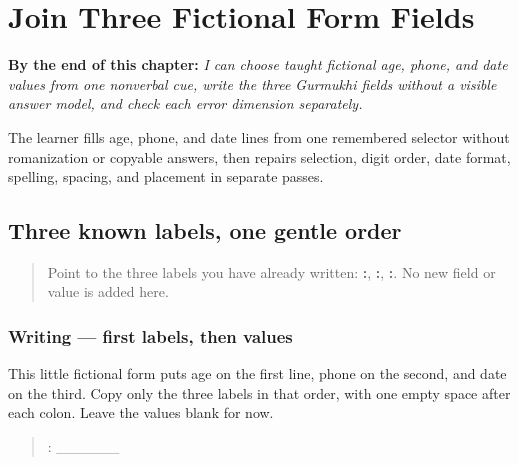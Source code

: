 
\chapter{Join Three Fictional Form Fields}
\label{ch:pa-form-age-phone-date-checkpoint}

\begin{chapteropening}
\textbf{By the end of this chapter:} \emph{I can choose taught fictional age, phone, and date values from one nonverbal cue, write the three Gurmukhi fields without a visible answer model, and check each error dimension separately.}

The learner fills age, phone, and date lines from one remembered selector without romanization or copyable answers, then repairs selection, digit order, date format, spelling, spacing, and placement in separate passes.
\end{chapteropening}

\section[\texorpdfstring{\pa{ਉਮਰ}: · \pa{ਫ਼ੋਨ} … (three familiar …)}{ਉਮਰ: · ਫ਼ੋਨ … (three familiar …)}]{Three known labels, one gentle order}

\label{lesson:PA-W10-form-order}



\begin{quote}
Point to the three labels you have already written: \textbf{:}, \textbf{:}, \textbf{:}. No new field or value is added here.
\end{quote}

\subsection*{Writing — first labels, then values}
This little fictional form puts age on the first line, phone on the second, and date on the third. Copy only the three labels in that order, with one empty space after each colon. Leave the values blank for now.

\begin{quote}
: \_\_\_\_\_\_
\end{quote}

